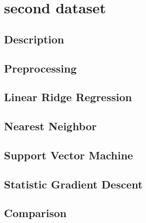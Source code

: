\section{second dataset}
\subsection{Description}
\subsection{Preprocessing}
\subsection{Linear Ridge Regression}
\subsection{Nearest Neighbor}
\subsection{Support Vector Machine}
\subsection{Statistic Gradient Descent}
\subsection{Comparison}
